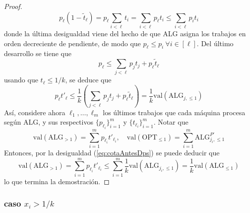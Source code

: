 \documentclass[10pt]{article}
\newcommand{\val}[1]{\text{val}(#1)}
\theoremstyle{plain}
\theoremstyle{definition}
\begin{document}
\begin{proof}
\begin{equation*}
 p_\ell(1-\tilde{t}_\ell) = p_\ell\sum_{i < \ell} t_i = \sum_{i < \ell} p_\ell t_i \leq  \sum_{i < \ell} p_i t_i
\end{equation*}
donde la última desigualdad viene del hecho de que ALG asigna los trabajos en orden decreciente de pendiente, de modo que $p_\ell \leq p_i \ \forall i \in [\ell]$. Del último desarrollo se tiene que
\begin{equation}
\label{eq:cotasGan}
p_\ell \leq \sum_{j < \ell} p_j t_j + p_\ell \tilde{t}_\ell
\end{equation}
usando que $t_\ell \leq 1/k$, se deduce que
\begin{equation}
\label{eq:cotaAntesDps}
p_\ell t'_\ell \leq \frac{1}{k}\left(\sum_{j < \ell} p_j t_j + p_\ell \tilde{t}_\ell \right) = \frac{1}{k}\val{\text{ALG}_{j,\leq 1}}
\end{equation}
Así, considere ahora $\ell_1, \ldots, \ell_m$ los \'ultimos trabajos que cada m\'aquina procesa seg\'un ALG, y sus respectivos $\{p_{\ell_i}\}_{i=1}^m$ y $\{t_{\ell_i}\}_{i=1}^m$. Notar que
$$
\val{\text{ALG}_{>1}} = \sum_{i = 1}^m p_{\ell_i}t'_{\ell_i}, \quad   \val{\text{OPT}_{\leq 1}}  = \sum_{i=1}^m \text{ALG}^{P'}_{j_i,\leq 1}  
$$
Entonces, por la desigualdad (\ref{eq:cotaAntesDps}) se puede deducir que
\begin{equation*}
\val{\text{ALG}_{>1}} = \sum_{i = 1}^m p_{\ell_i} t'_{\ell_i} \leq \sum_{i=1}^m \frac{1}{k} \val{\text{ALG}_{j_i,\leq 1}} = \frac{1}{k} \val{\text{ALG}_{\leq 1}}
\end{equation*}
lo que termina la demostración.
\end{proof}
\subsubsection*{caso $x_i >1/k$}
\newpage

\end{document}
